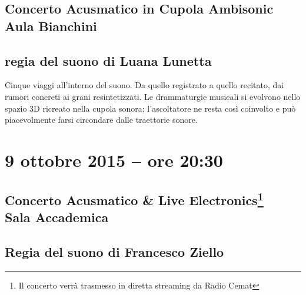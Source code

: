 \documentclass[8pt, twoside, a5paper]{extreport}
\begin{document}
\subsection*{{\small Concerto Acusmatico in Cupola Ambisonic} \\
	\textsf{Aula Bianchini}}

{\fontsize{30}{30} }

\subsection*{\textsf{regia del suono di Luana Lunetta}}

Cinque viaggi all'interno del suono.
Da quello registrato a quello recitato, dai rumori concreti ai grani resintetizzati.
Le drammaturgie musicali si evolvono nello spazio 3D ricreato nella cupola sonora; l'ascoltatore ne resta così coinvolto e può piacevolmente farsi circondare dalle traettorie sonore.


\begin{multicols}{2}




\end{multicols}

\clearpage

\section*{9 ottobre 2015 -- ore 20:30}

\subsection*{{\small Concerto Acusmatico \& Live Electronics\footnote{ Il concerto verrà trasmesso in diretta streaming da Radio Cemat}} \\
	\textsf{Sala Accademica}}

{\fontsize{30}{30} }

\subsection*{\textsf{Regia del suono di Francesco Ziello}}

\bigskip

\begin{multicols}{2}




\end{multicols}
\end{document}
